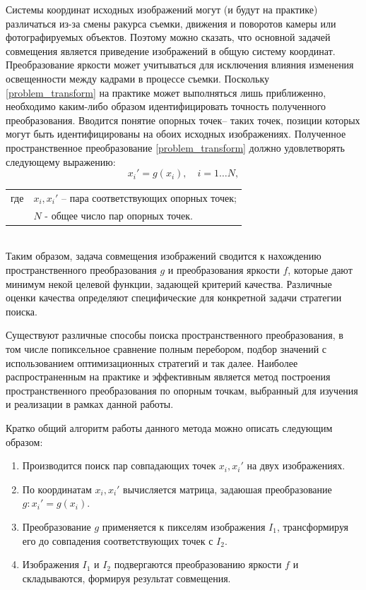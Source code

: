 {{   Системы координат исходных изображений могут (и будут на практике) различаться из-за смены ракурса съемки, движения и поворотов камеры или фотографируемых объектов. Поэтому можно сказать, что основной задачей совмещения является приведение изображений в общую систему координат.
   Преобразование яркости может учитываться для исключения влияния изменения освещенности между кадрами в процессе съемки. Поскольку \eqref{problem_transform} на практике может выполняться лишь приближенно, необходимо каким-либо образом идентифицировать точность полученного преобразования. 
   Вводится понятие опорных точек-- таких точек, позиции которых могут быть идентифицированы на обоих исходных изображениях. Полученное пространственное преобразование \eqref{problem_transform} должно удовлетворять следующему выражению:
   \begin{equation}\label{problem_constraints}
   x_i' = g(x_i), \quad i=1 \hdots N,
   \end{equation} 
   \begin{tabular}{ rl }
   \quad \quad где 
   & $x_i, x_i'$ -- пара соответствующих опорных точек;\\
   & $N$ - общее число пар опорных точек. \\
   \end{tabular}\\
   
   Таким образом, задача совмещения изображений сводится к нахождению пространственного преобразования $g$ и преобразования яркости $f$, которые дают минимум некой целевой функции, задающей критерий качества. Различные оценки качества определяют специфические для конкретной задачи стратегии поиска.   
   
   Существуют различные способы поиска пространственного преобразования, в том числе попиксельное сравнение полным перебором, подбор значений с использованием оптимизационных стратегий и так далее. Наиболее распространенным на практике и эффективным является метод построения пространственного преобразования по опорным точкам, выбранный для изучения и реализации в рамках данной работы. 
   
   Кратко общий алгоритм работы данного метода можно описать следующим образом:
   \begin{enumerate}
   	\item Производится поиск пар совпадающих точек $x_i, x_i'$ на двух изображениях.
   	\item По координатам $x_i, x_i'$ вычисляется матрица, задаюшая преобразование $g: x_i' = g(x_i)$.
   	\item Преобразование $g$ применяется к пикселям изображения $I_1$, трансформируя его до совпадения соответствующих точек с $I_2$.
   	\item Изображения $I_1$ и $I_2$ подвергаются преобразованию яркости $f$ и складываются, формируя результат совмещения.
   \end{enumerate} 

}}
